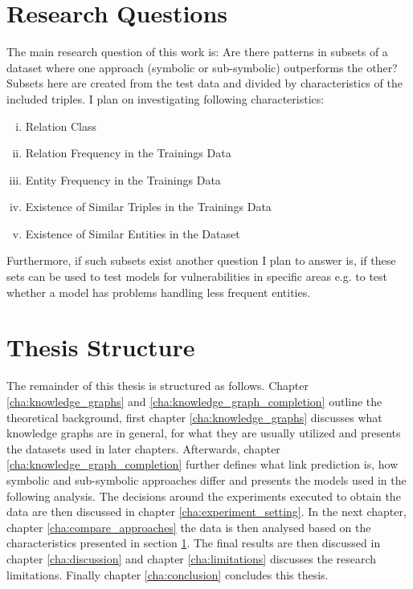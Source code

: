 \section{Research Questions}
\label{sec:research_questions}
The main research question of this work is: Are there patterns in subsets of a dataset where one approach (symbolic or sub-symbolic) outperforms the other? 
Subsets here are created from the test data and divided by characteristics of the included triples. I plan on investigating following characteristics:

\begin{enumerate}[(i)]
\item Relation Class
\item Relation Frequency in the Trainings Data
\item Entity Frequency in the Trainings Data
\item Existence of Similar Triples in the Trainings Data
\item Existence of Similar Entities in the Dataset
\end{enumerate}

Furthermore, if such subsets exist another question I plan to answer is, if these sets can be used to test models for vulnerabilities in specific areas e.g. to test whether a model has problems handling less frequent entities. 

\section{Thesis Structure}
The remainder of this thesis is structured as follows. Chapter \ref{cha:knowledge_graphs} and \ref{cha:knowledge_graph_completion} outline the theoretical background, first chapter \ref{cha:knowledge_graphs} discusses what knowledge graphs are in general, for what they are usually utilized and presents the datasets used in later chapters. Afterwards, chapter \ref{cha:knowledge_graph_completion} further defines what link prediction is, how symbolic and sub-symbolic approaches differ and presents the models used in the following analysis. The decisions around the experiments executed to obtain the data are then discussed in chapter \ref{cha:experiment_setting}. In the next chapter, chapter \ref{cha:compare_approaches} the data is then analysed based on the characteristics presented in section \ref{sec:research_questions}. The final results are then discussed in chapter \ref{cha:discussion} and chapter \ref{cha:limitations} discusses the research limitations. Finally chapter \ref{cha:conclusion} concludes this thesis.